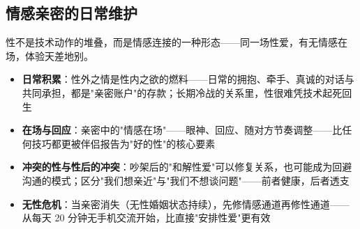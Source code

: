\subsection{情感亲密的日常维护}

性不是技术动作的堆叠，而是情感连接的一种形态——同一场性爱，有无情感在场，体验天差地别。

\begin{itemize}
	\item \textbf{日常积累}：性外之情是性内之欲的燃料——日常的拥抱、牵手、真诚的对话与共同承担，都是"亲密账户"的存款；长期冷战的关系里，性很难凭技术起死回生
	\item \textbf{在场与回应}：亲密中的"情感在场"——眼神、回应、随对方节奏调整——比任何技巧都更被伴侣报告为"好的性"的核心要素
	\item \textbf{冲突的性与性后的冲突}：吵架后的"和解性爱"可以修复关系，也可能成为回避沟通的模式；区分"我们想亲近"与"我们不想谈问题"——前者健康，后者透支
	\item \textbf{无性危机}：当亲密消失（无性婚姻状态持续），先修情感通道再修性通道——从每天 20 分钟无手机交流开始，比直接"安排性爱"更有效
\end{itemize}
